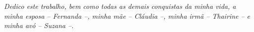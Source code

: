 \documentclass[12pt,twoside,oneright,a4paper,chapter=TITLE,english,brazil]{unipampa}
\begin{document}
\imprimircapa                   %

\imprimirfolhaderosto*          %

\imprimirfichacatalografica     %

\imprimirfolhadeaprovacao       %


\begin{dedicatoria}
    \textit{Dedico este trabalho, bem como todas as demais conquistas da minha vida, a minha esposa -- Fernanda --, minha mãe -- Cláudia --, minha irmã -- Thairine -- e minha avó -- Suzana --.} 
\end{dedicatoria}
\end{document}
